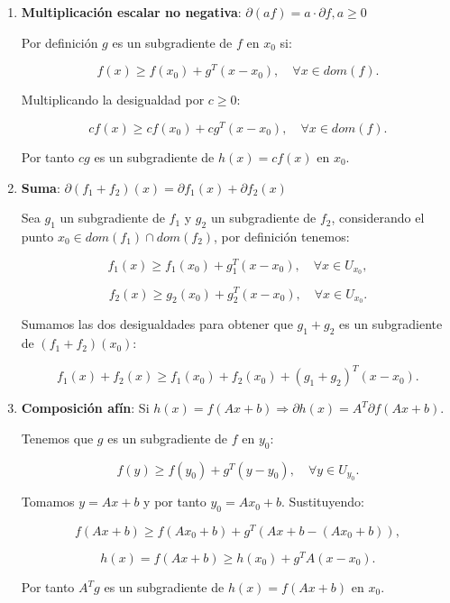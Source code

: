 \begin{enumerate}

	\item{\textbf{Multiplicación escalar no negativa}: $\partial (af) = a \cdot \partial f , a\geq0$
	
	Por definición $g$ es un subgradiente de $f$ en $x_0$ si:
	
	$$f(x) \geq f(x_0) + g^T(x-x_0), \quad \forall x \in dom(f).$$

	Multiplicando la desigualdad por $c \geq 0$:

	$$cf(x) \geq cf(x_0) + cg^T(x-x_0), \quad \forall x \in dom(f).$$

	Por tanto $cg$ es un subgradiente de $h(x)=cf(x)$ en $x_0$.

	}
	
	\item{ \textbf{Suma}: $\partial (f_1+f_2)(x) = \partial f_1(x) + \partial f_2(x)$

	Sea $g_1$ un subgradiente de $f_1$ y $g_2$ un subgradiente de $f_2$, considerando el punto $x_0 \in dom(f_1) \cap dom(f_2)$, por definición tenemos:

	$$f_1(x) \geq f_1(x_0) + g_1^T(x-x_0), \quad \forall x \in U_{x_0},$$

	$$f_2(x) \geq g_2(x_0) + g_2^T(x-x_0), \quad \forall x \in U_{x_0}.$$

	Sumamos las dos desigualdades para obtener que $g_1 + g_2$ es un subgradiente de $(f_1 + f_2)(x_0)$:

	$$f_1(x) + f_2(x) \geq f_1(x_0) + f_2(x_0) + \left ( g_1 + g_2 \right ) ^T \left ( x - x_0 \right ).$$


	}
	
	\item{ \textbf{Composición afín}: Si $h(x)=f(Ax + b) \Rightarrow \partial h(x)= A^T \partial f(Ax+b)$.
	
	Tenemos que $g$ es un subgradiente de $f$ en $y_0$:
	
	$$f(y) \geq f(y_0) + g^T(y-y_0), \quad \forall y \in U_{y_0}.$$

	Tomamos $y=Ax + b$ y por tanto $y_0= Ax_0 + b$. Sustituyendo:

	$$f(Ax + b) \geq f(Ax_0 + b) + g^T(Ax + b - (Ax_0 + b)),$$

	$$h(x)=f(Ax+b) \geq h(x_0) + g^TA(x-x_0).$$

	Por tanto $A^Tg$ es un subgradiente de $h(x)=f(Ax+b)$ en $x_0$.

	}
	
\end{enumerate}


